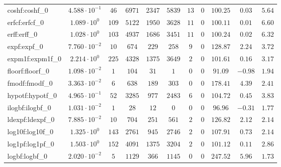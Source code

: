 \begin{tabular}{|l|c|c|c|c|c|c|c|c|c|c|}
coshf:coshf\_0               & $ 4.588 \cdot 10^{-1} $ & $ 46     $ & $ 6971   $ & $ 2347  $ & $ 5839  $ & $ 13  $ & $ 0 $ & $ 100.25      $ & $ 0.03    $ & $ 5.64    $ \\
erfcf:erfcf\_0               & $ 1.089 \cdot 10^{0}  $ & $ 109    $ & $ 5122   $ & $ 1950  $ & $ 3628  $ & $ 11  $ & $ 0 $ & $ 100.11      $ & $ 0.01    $ & $ 6.60    $ \\
erff:erff\_0                 & $ 1.028 \cdot 10^{0}  $ & $ 103    $ & $ 4937   $ & $ 1686  $ & $ 3451  $ & $ 11  $ & $ 0 $ & $ 100.24      $ & $ 0.02    $ & $ 6.32    $ \\
expf:expf\_0                 & $ 7.760 \cdot 10^{-2} $ & $ 10     $ & $ 674    $ & $ 229   $ & $ 258   $ & $ 9   $ & $ 0 $ & $ 128.87      $ & $ 2.24    $ & $ 3.72    $ \\
expm1f:expm1f\_0             & $ 2.214 \cdot 10^{0}  $ & $ 225    $ & $ 4328   $ & $ 1375  $ & $ 3649  $ & $ 2   $ & $ 0 $ & $ 101.61      $ & $ 0.16    $ & $ 3.17    $ \\
floorf:floorf\_0             & $ 1.098 \cdot 10^{-2} $ & $ 1      $ & $ 104    $ & $ 31    $ & $ 1     $ & $ 0   $ & $ 0 $ & $ 91.09       $ & $ -0.98   $ & $ 1.94    $ \\
fmodf:fmodf\_0               & $ 3.363 \cdot 10^{-2} $ & $ 6      $ & $ 638    $ & $ 189   $ & $ 303   $ & $ 0   $ & $ 0 $ & $ 178.41      $ & $ 4.39    $ & $ 2.41    $ \\
hypotf:hypotf\_0             & $ 4.965 \cdot 10^{-1} $ & $ 52     $ & $ 3285   $ & $ 977   $ & $ 2483  $ & $ 6   $ & $ 0 $ & $ 104.72      $ & $ 0.45    $ & $ 3.83    $ \\
ilogbf:ilogbf\_0             & $ 1.031 \cdot 10^{-2} $ & $ 1      $ & $ 28     $ & $ 12    $ & $ 0     $ & $ 0   $ & $ 0 $ & $ 96.96       $ & $ -0.31   $ & $ 1.77    $ \\
ldexpf:ldexpf\_0             & $ 7.885 \cdot 10^{-2} $ & $ 10     $ & $ 704    $ & $ 251   $ & $ 561   $ & $ 2   $ & $ 0 $ & $ 126.82      $ & $ 2.12    $ & $ 2.14    $ \\
log10f:log10f\_0             & $ 1.325 \cdot 10^{0}  $ & $ 143    $ & $ 2761   $ & $ 945   $ & $ 2746  $ & $ 2   $ & $ 0 $ & $ 107.91      $ & $ 0.73    $ & $ 2.14    $ \\
log1pf:log1pf\_0             & $ 1.503 \cdot 10^{0}  $ & $ 152    $ & $ 4091   $ & $ 1375  $ & $ 3204  $ & $ 2   $ & $ 0 $ & $ 101.12      $ & $ 0.11    $ & $ 2.86    $ \\
logbf:logbf\_0               & $ 2.020 \cdot 10^{-2} $ & $ 5      $ & $ 1129   $ & $ 366   $ & $ 1145  $ & $ 0   $ & $ 0 $ & $ 247.52      $ & $ 5.96    $ & $ 1.73    $ \\

\end{tabular}
